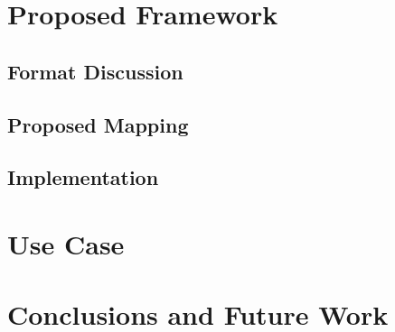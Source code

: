 \documentclass[conference]{IEEEconf}
\begin{document}
\section{Proposed Framework}\label{sec:framework}

\subsection{Format Discussion}
\subsection{Proposed Mapping}
\subsection{Implementation}

\section{Use Case}\label{sec:use-case}

\section{Conclusions and Future Work}\label{sec:future-work}








\end{document}
